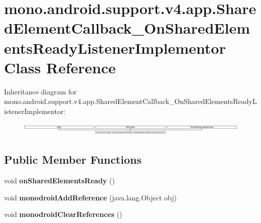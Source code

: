 \hypertarget{classmono_1_1android_1_1support_1_1v4_1_1app_1_1_shared_element_callback___on_shared_elements_ready_listener_implementor}{}\section{mono.\+android.\+support.\+v4.\+app.\+Shared\+Element\+Callback\+\_\+\+On\+Shared\+Elements\+Ready\+Listener\+Implementor Class Reference}
\label{classmono_1_1android_1_1support_1_1v4_1_1app_1_1_shared_element_callback___on_shared_elements_ready_listener_implementor}
Inheritance diagram for mono.\+android.\+support.\+v4.\+app.\+Shared\+Element\+Callback\+\_\+\+On\+Shared\+Elements\+Ready\+Listener\+Implementor\+:\begin{figure}[H]
\begin{center}
\leavevmode
\includegraphics[height=0.636002cm]{classmono_1_1android_1_1support_1_1v4_1_1app_1_1_shared_element_callback___on_shared_elements_ready_listener_implementor}
\end{center}
\end{figure}
\subsection*{Public Member Functions}
\begin{DoxyCompactItemize}
\item 
\mbox{\label{classmono_1_1android_1_1support_1_1v4_1_1app_1_1_shared_element_callback___on_shared_elements_ready_listener_implementor_a1c76f286348f96d584d4ca5cb7f7ae91}} 
void {\bfseries on\+Shared\+Elements\+Ready} ()
\item 
\mbox{\label{classmono_1_1android_1_1support_1_1v4_1_1app_1_1_shared_element_callback___on_shared_elements_ready_listener_implementor_a0c23882816bc9a3c60a20b6b78ddcecd}} 
void {\bfseries monodroid\+Add\+Reference} (java.\+lang.\+Object obj)
\item 
\mbox{\label{classmono_1_1android_1_1support_1_1v4_1_1app_1_1_shared_element_callback___on_shared_elements_ready_listener_implementor_ad09c450b8d36eac5011c443f7ef17dbd}} 
void {\bfseries monodroid\+Clear\+References} ()
\end{DoxyCompactItemize}
